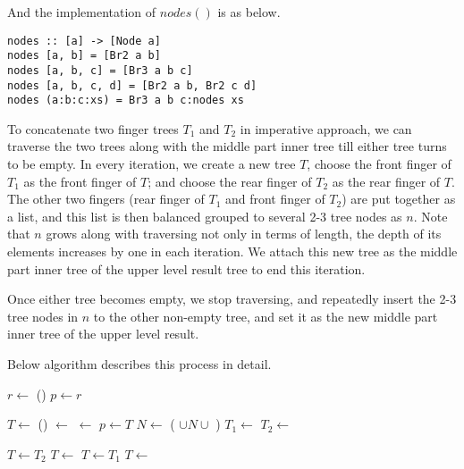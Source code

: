 \documentclass[UTF8]{article}
\begin{document}
And the implementation of $nodes()$ is as below.

\begin{lstlisting}
nodes :: [a] -> [Node a]
nodes [a, b] = [Br2 a b]
nodes [a, b, c] = [Br3 a b c]
nodes [a, b, c, d] = [Br2 a b, Br2 c d]
nodes (a:b:c:xs) = Br3 a b c:nodes xs
\end{lstlisting}

To concatenate two finger trees $T_1$ and $T_2$ in imperative approach, we can traverse the two trees along
with the middle part inner tree till either tree turns to be empty. In every iteration,
we create a new tree $T$, choose the front finger of $T_1$ as the front finger of $T$; and choose the
rear finger of $T_2$ as the rear finger of $T$. The other two fingers (rear finger of $T_1$ and front finger
of $T_2$) are put together as a list, and this list is then balanced grouped to several 2-3 tree nodes as $n$.
Note that $n$ grows along with traversing not only in terms of length, the depth of its elements
increases by one in each iteration. We attach this new tree as the middle part inner tree of the
upper level result tree to end this iteration.

Once either tree becomes empty, we stop traversing, and repeatedly insert the 2-3 tree nodes in $n$ to
the other non-empty tree, and set it as the new middle part inner tree of the upper level result.

Below algorithm describes this process in detail.

\begin{algorithmic}
  \State \Return {}
\EndFunction
\Statex
{}
  \State $r \gets$ ()
  \State $p \gets r$

    \State $T \gets$ ()
    \State {} $\gets$ 
    \State {} $\gets$ 
    \State {}
    \State $p \gets T$
    \State $N \gets$ ( $\cup N \cup$ )
    \State $T_1 \gets$ 
    \State $T_2 \gets$ 
  \EndWhile

    \State $T \gets T_2$
      \State $T \gets$ 
    \EndFor
    \State $T \gets T_1$
      \State $T \gets$ 
    \EndFor
  \EndIf
  \State {}

  \State \Return {}
\EndFunction
\end{algorithmic}
\end{document}
